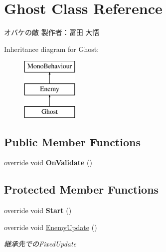\hypertarget{class_ghost}{}\section{Ghost Class Reference}
\label{class_ghost}


オバケの敵 製作者：冨田 大悟  


Inheritance diagram for Ghost\+:\begin{figure}[H]
\begin{center}
\leavevmode
\includegraphics[height=3.000000cm]{class_ghost}
\end{center}
\end{figure}
\subsection*{Public Member Functions}
\begin{DoxyCompactItemize}
\item 
\mbox{\label{class_ghost_aecacf29e4c7f04b159b1a1b9073aed10}} 
override void {\bfseries On\+Validate} ()
\end{DoxyCompactItemize}
\subsection*{Protected Member Functions}
\begin{DoxyCompactItemize}
\item 
\mbox{\label{class_ghost_a6c43d5bf054d7ca7948911ab15e9e26b}} 
override void {\bfseries Start} ()
\item 
override void \hyperlink{class_ghost_a26c210f4d5bfbecc82cd577fafb0cfdb}{Enemy\+Update} ()
\begin{DoxyCompactList}\small\item\em 継承先での\+Fixed\+Update \end{DoxyCompactList}\end{DoxyCompactItemize}
